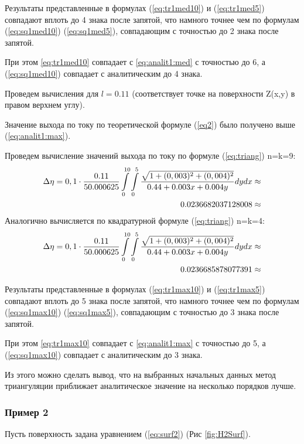 \documentclass{article}
\begin{document}
Результаты представленные в формулах (\ref{eq:tr1med10}) и (\ref{eq:tr1med5}) совпадают вплоть до 4 знака после запятой, что намного точнее чем по формулам (\ref{eq:sq1med10}) (\ref{eq:sq1med5}), совпадающим с точностью до 2 знака после запятой.

При этом \ref{eq:tr1med10} совпадает с \ref{eq:analit1:med} с точностью до 6, а (\ref{eq:sq1med10}) совпадает с аналитическим до 4 знака.

Проведем вычисления для $l=0.11$ (соответствует точке на поверхности Z(x,y) в правом верхнем углу).

Значение выхода по току по теоретической формуле (\ref{eq2}) было получено выше (\ref{eq:analit1:max}).

Проведем вычисление значений выхода по току по формуле (\ref{eq:triang}) n=k=9:
\begin{align} \label{eq:tr1max10}
\Delta \eta = 0,1 \cdot \frac{0.11}{50.000625} \int\limits_0^{10} \int\limits_0^5 \frac{\sqrt{1+(0,003)^2+(0,004)^2}}{0.44 + 0.003x + 0.004y} dy dx \approx \notag \\ 0.0236682037128008
\approx
\end{align}
Аналогично вычисляется по квадратурной формуле (\ref{eq:triang}) n=k=4:
\begin{align} \label{eq:tr1max5}
\Delta \eta = 0,1 \cdot \frac{0.11}{50.000625} \int\limits_0^{10} \int\limits_0^5 \frac{\sqrt{1+(0,003)^2+(0,004)^2}}{0.44 + 0.003x + 0.004y} dy dx \approx \notag \\ 0.0236685878077391
\approx
\end{align}

Результаты представленные в формулах (\ref{eq:tr1max10}) и (\ref{eq:tr1max5}) совпадают вплоть до 5 знака после запятой, что намного точнее чем по формулам (\ref{eq:sq1max10}) (\ref{eq:sq1max5}), совпадающим с точностью до 3 знака после запятой.

При этом \ref{eq:tr1max10} совпадает с \ref{eq:analit1:max} с точностью до 5, а (\ref{eq:sq1max10}) совпадает с аналитическим до 3 знака.

Из этого можно сделать вывод, что на выбранных начальных данных метод триангуляции приближает аналитическое значение на несколько порядков лучше.

\subsubsection*{Пример 2}\label{ex2tr}
Пусть поверхность задана уравнением (\ref{eq:surf2}) (Рис \ref{fig:H2Surf}).
\end{document}
